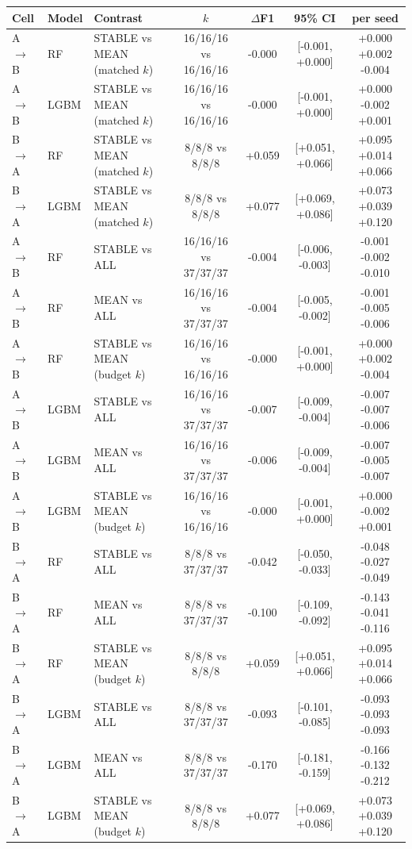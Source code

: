 \begin{tabular}{lllcccc}
\toprule
Cell & Model & Contrast & $k$ & $\Delta$F1 & 95\% CI & per seed \\
\midrule
A$\rightarrow$B & RF & STABLE vs MEAN (matched $k$) & 16/16/16 vs 16/16/16 & -0.000 & [-0.001, +0.000] & +0.000 +0.002 -0.004 \\
A$\rightarrow$B & LGBM & STABLE vs MEAN (matched $k$) & 16/16/16 vs 16/16/16 & -0.000 & [-0.001, +0.000] & +0.000 -0.002 +0.001 \\
B$\rightarrow$A & RF & STABLE vs MEAN (matched $k$) & 8/8/8 vs 8/8/8 & +0.059 & [+0.051, +0.066] & +0.095 +0.014 +0.066 \\
B$\rightarrow$A & LGBM & STABLE vs MEAN (matched $k$) & 8/8/8 vs 8/8/8 & +0.077 & [+0.069, +0.086] & +0.073 +0.039 +0.120 \\
\midrule
A$\rightarrow$B & RF & STABLE vs ALL & 16/16/16 vs 37/37/37 & -0.004 & [-0.006, -0.003] & -0.001 -0.002 -0.010 \\
A$\rightarrow$B & RF & MEAN vs ALL & 16/16/16 vs 37/37/37 & -0.004 & [-0.005, -0.002] & -0.001 -0.005 -0.006 \\
A$\rightarrow$B & RF & STABLE vs MEAN (budget $k$) & 16/16/16 vs 16/16/16 & -0.000 & [-0.001, +0.000] & +0.000 +0.002 -0.004 \\
A$\rightarrow$B & LGBM & STABLE vs ALL & 16/16/16 vs 37/37/37 & -0.007 & [-0.009, -0.004] & -0.007 -0.007 -0.006 \\
A$\rightarrow$B & LGBM & MEAN vs ALL & 16/16/16 vs 37/37/37 & -0.006 & [-0.009, -0.004] & -0.007 -0.005 -0.007 \\
A$\rightarrow$B & LGBM & STABLE vs MEAN (budget $k$) & 16/16/16 vs 16/16/16 & -0.000 & [-0.001, +0.000] & +0.000 -0.002 +0.001 \\
B$\rightarrow$A & RF & STABLE vs ALL & 8/8/8 vs 37/37/37 & -0.042 & [-0.050, -0.033] & -0.048 -0.027 -0.049 \\
B$\rightarrow$A & RF & MEAN vs ALL & 8/8/8 vs 37/37/37 & -0.100 & [-0.109, -0.092] & -0.143 -0.041 -0.116 \\
B$\rightarrow$A & RF & STABLE vs MEAN (budget $k$) & 8/8/8 vs 8/8/8 & +0.059 & [+0.051, +0.066] & +0.095 +0.014 +0.066 \\
B$\rightarrow$A & LGBM & STABLE vs ALL & 8/8/8 vs 37/37/37 & -0.093 & [-0.101, -0.085] & -0.093 -0.093 -0.093 \\
B$\rightarrow$A & LGBM & MEAN vs ALL & 8/8/8 vs 37/37/37 & -0.170 & [-0.181, -0.159] & -0.166 -0.132 -0.212 \\
B$\rightarrow$A & LGBM & STABLE vs MEAN (budget $k$) & 8/8/8 vs 8/8/8 & +0.077 & [+0.069, +0.086] & +0.073 +0.039 +0.120 \\
\bottomrule
\end{tabular}
